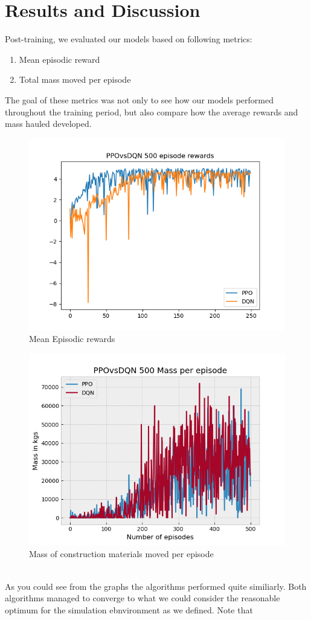 \documentclass[conference]{IEEEtran}
\begin{document}
\section{Results and Discussion}
Post-training, we evaluated our models based on following metrics:
\begin{enumerate}
	\item Mean episodic reward
	\item Total mass moved per episode
\end{enumerate}
The goal of these metrics was not only to see how our models performed throughout the training period, but also compare how the average rewards and mass hauled developed.
\begin{figure}[h!]
	\includegraphics[width=\columnwidth]{graphs/PPOvsDQN250.png}
	\caption{Mean Episodic rewards}
\end{figure}
\begin{figure}[h!]
	\includegraphics[width=\columnwidth]{graphs/PPOvsDQN500mass.png}
	\caption{Mass of construction materials moved per episode}
\end{figure}
\\
As you could see from the graphs the algorithms performed quite similiarly.
Both algorithms managed to converge to what we could consider the reasonable optimum for the simulation ebnvironment as we defined. Note that
\end{document}
